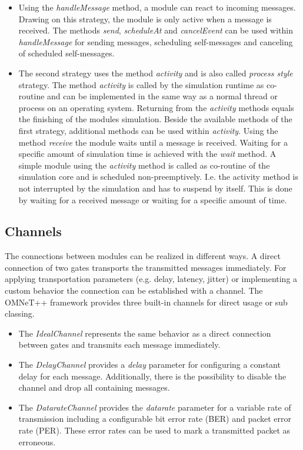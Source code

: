 \begin{itemize}
    \item Using the \emph{handleMessage} method, a module can react to incoming messages.
    Drawing on this strategy, the module is only active when a message is received.
    The methods \emph{send}, \emph{scheduleAt} and \emph{cancelEvent} can be used within \emph{handleMessage} for sending messages, scheduling self-messages and canceling of scheduled self-messages. \cite[section 4.4.1]{omnet_manual}
    
    \item The second strategy uses the method \emph{activity} and is also called \emph{process style} strategy.
    The method \emph{activity} is called by the simulation runtime as co-routine and can be implemented in the same way as a normal thread or process on an operating system.
    Returning from the \emph{activity} methods equals the finishing of the modules simulation.
    Beside the available methods of the first strategy, additional methods can be used within \emph{activity}.
    Using the method \emph{receive} the module waits until a message is received.
    Waiting for a specific amount of simulation time is achieved with the \emph{wait} method.
    A simple module using the \emph{activity} method is called as co-routine of the simulation core and is scheduled non-preemptively.
    I.e. the activity method is not interrupted by the simulation and has to suspend by itself.
    This is done by waiting for a received message or waiting for a specific amount of time. \cite[section 4.4.2]{omnet_manual}
\end{itemize}

\subsection{Channels}
\label{sec:omnet_components_channels}
The connections between modules can be realized in different ways.
A direct connection of two gates transports the transmitted messages immediately.
For applying transportation parameters (e.g. delay, latency, jitter) or implementing a custom behavior the connection can be established with a channel.
The OMNeT++ framework provides three built-in channels for direct usage or sub classing.

\begin{itemize}
    \item The \emph{IdealChannel} represents the same behavior as a direct connection between gates and transmits each message immediately.
    \item The \emph{DelayChannel} provides a \emph{delay} parameter for configuring a constant delay for each message.
    Additionally, there is the possibility to disable the channel and drop all containing messages.
    \item The \emph{DatarateChannel} provides the \emph{datarate} parameter for a variable rate of transmission including a configurable bit error rate (BER) and packet error rate (PER).
    These error rates can be used to mark a transmitted packet as erroneous.
\end{itemize}

